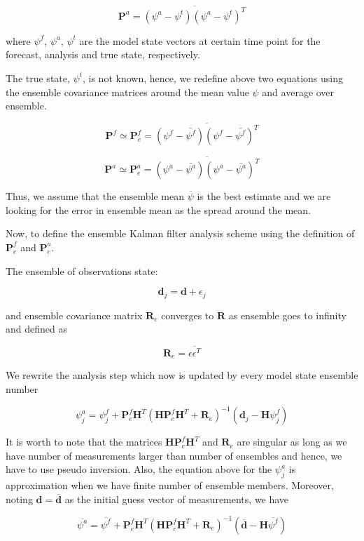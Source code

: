 \documentclass[a4,12pt]{article}
\numberwithin{equation}{section}
\begin{document}
$$\textbf{P}^{a} = \overline{(\psi^{a}-\psi^{t})(\psi^{a}-\psi^{t})^{T}}$$

where $\psi ^{f}$, $\psi ^{a}$, $\psi ^{t}$ are the model state vectors at certain time point for the forecast, analysis and true state, respectively.

The true state, $\psi ^{t}$, is not known, hence, we redefine above two equations using the ensemble covariance matrices around the mean value $\psi$ and average over ensemble. 

$$\textbf{P}^{f} \simeq \textbf{P}^{f}_{e} = \overline{(\psi^{f}-\bar{\psi^{f}})(\psi^{f}-\bar{\psi^{f}})^{T}}$$

$$\textbf{P}^{a} \simeq \textbf{P}^{a}_{e}= \overline{ (\psi^{a}-\bar {\psi^{a}})(\psi^{a}-\bar{\psi^{a}})^{T} }$$

Thus, we assume that the ensemble mean $\overline {\psi}$ is the best estimate  and we are looking for the error in ensemble mean as the spread around the mean.

Now, to define the ensemble Kalman filter analysis scheme using the definition of $\textbf{P}^{f}_{e}$ and $\textbf{P}^{a}_{e}$.

The ensemble of observations state:

$$\textbf{d}_{j} = \textbf{d} + \epsilon_{j}$$

and ensemble covariance matrix $\textbf{R}_{e}$ converges to $\textbf{R}$ as ensemble goes to infinity and defined as 

$$\textbf{R}_{e} = \overline{\epsilon \epsilon ^{T}}$$

We rewrite the analysis step which now is updated by every model state ensemble number

$$\psi ^{a} _{j}= \psi ^{f}_{j} + \textbf{P} _{e} ^{f}\textbf{H} ^{T}(\textbf{HP}_{e} ^{f}\textbf{H} ^{T}+\textbf{R}_{e}) ^{-1}(\textbf{d}_{j}-\textbf{H}\psi ^{f}_{j})$$

It is worth to note that the matrices $\textbf{H}\textbf{P}^{f}_{e}\textbf{H}^{T}$ and $\textbf{R}_{e}$ are singular as long as we have number of measurements larger than number of ensembles and hence, we have to use pseudo inversion. Also, the equation above for the $\psi ^{a} _{j}$ is approximation when we have finite number of ensemble members. Moreover, noting $\textbf{d} = \overline{\textbf{d}}$ as the initial guess vector of measurements, we have

$$\overline{\psi ^{a}} = \overline{\psi ^{f}} + \textbf{P} ^{f}_{e}\textbf{H} ^{T}(\textbf{HP}_{e} ^{f}\textbf{H} ^{T}+\textbf{R}_{e}) ^{-1}(\overline{\textbf{d}}-\textbf{H}\overline{\psi ^{f}})$$
\end{document}
